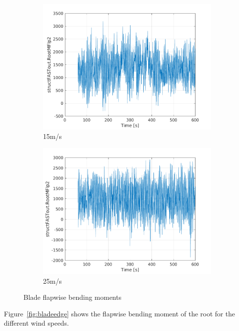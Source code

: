 \documentclass[10pt]{article}
\begin{document}
\begin{figure}[H]
\begin{subfigure}{0.40\textwidth}
  \includegraphics[width=1\linewidth]{../CIP_6/FAST/Plots_ws15/RootMFlp2.png}
  \caption{15m/s}
\end{subfigure}
\begin{subfigure}{0.40\textwidth}
  \includegraphics[width=1\linewidth]{../CIP_6/FAST/Plots_ws25/RootMFlp2.png}
  \caption{25m/s}
\end{subfigure}
\caption{Blade flapwise bending moments}
\label{fig:bladeflap}
\end{figure}

Figure~\ref{fig:bladeedge} shows the flapwise bending moment of the root for the different wind speeds.
\end{document}
